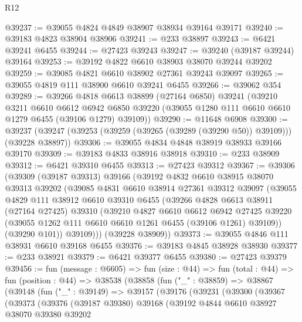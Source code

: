 \begin{lexlean}{R12}
\begin{coremodule}
@39237 := @39055 @4824 @4849 @38907 @38934 @39164 @39171
@39240 := @39183 @4823 @38904 @38906
@39241 := @233 @38897
@39243 := @6421 @39241 @6455
@39244 := @27423 @39243
@39247 := @39240 (@39187 @39244) @39164
@39253 := @39192 @4822 @6610 @38903 @38070 @39244 @39202
@39259 := @39085 @4821 @6610 @38902 @27361 @39243 @39097
@39265 := @39055 @4819 @111 @38900 @6610 @39241 @6455
@39266 := @39062 @354
@39289 := @39266
    @4818
    @6613
    @38899
    (@27164 @6850)
    @39241
    (@39210
      @3211
      @6610
      @6612
      @6942
      @6850
      @39220
      (@39055 @1280 @111 @6610 @6610 @1279 @6455 (@39106 @1279) @39109))
@39290 := @11648 @6908
@39300 := @39237 (@39247 (@39253 (@39259 (@39265 (@39289 (@39290 @50)) @39109))) (@39228 @38897))
@39306 := @39055 @4834 @4848 @38919 @38933 @39166 @39170
@39309 := @39183 @4833 @38916 @38918
@39310 := @233 @38909
@39312 := @6421 @39310 @6455
@39313 := @27423 @39312
@39367 := @39306
    (@39309
      (@39187 @39313)
      @39166
      (@39192
        @4832
        @6610
        @38915
        @38070
        @39313
        @39202
        (@39085
          @4831
          @6610
          @38914
          @27361
          @39312
          @39097
          (@39055
            @4829
            @111
            @38912
            @6610
            @39310
            @6455
            (@39266
              @4828
              @6613
              @38911
              (@27164 @27425)
              @39310
              (@39210
                @4827
                @6610
                @6612
                @6942
                @27425
                @39220
                (@39055 @1262 @111 @6610 @6610 @1261 @6455 (@39106 @1261) @39109))
              (@39290 @101))
            @39109)))
      (@39228 @38909))
@39373 := @39055 @4846 @111 @38931 @6610 @39168 @6455
@39376 := @39183 @4845 @38928 @38930
@39377 := @233 @38921
@39379 := @6421 @39377 @6455
@39380 := @27423 @39379
@39456 := fun (message : @6605) =>
  fun (size : @44) =>
  fun (total : @44) =>
  fun (position : @44) =>
  @38538
    (@38858
      (fun ("_" : @38859) =>
      @38867
        (@39148
          (fun ("_" : @39149) =>
          @39157
            (@39176
              (@39231
                (@39300
                  (@39367
                    (@39373
                      (@39376
                        (@39187 @39380)
                        @39168
                        (@39192
                          @4844
                          @6610
                          @38927
                          @38070
                          @39380
                          @39202

\end{coremodule}
\end{lexlean}
